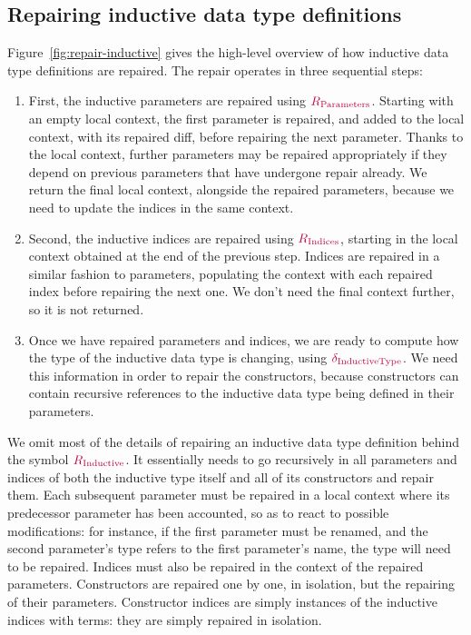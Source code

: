 \subsection{Repairing inductive data type definitions}

Figure~\ref{fig:repair-inductive} gives the high-level overview of how inductive
data type definitions are repaired.  The repair operates in three sequential
steps:

\begin{enumerate}

  \item First, the inductive parameters are repaired using
$\textcolor{purple}{R_{\text{Parameters}}}{}$.  Starting with an empty local context, the first
parameter is repaired, and added to the local context, with its repaired diff,
before repairing the next parameter.  Thanks to the local context, further
parameters may be repaired appropriately if they depend on previous parameters
that have undergone repair already.  We return the final local context,
alongside the repaired parameters, because we need to update the indices in the
same context.

  \item Second, the inductive indices are repaired using $\textcolor{purple}{R_{\text{Indices}}}{}$,
starting in the local context obtained at the end of the previous step.  Indices
are repaired in a similar fashion to parameters, populating the context with
each repaired index before repairing the next one.  We don't need the final
context further, so it is not returned.

  \item Once we have repaired parameters and indices, we are ready to compute
how the type of the inductive data type is changing, using
$\textcolor{purple}{\delta_{\text{InductiveType}}}{}$.  We need this information in order to repair the
constructors, because constructors can contain recursive references to the
inductive data type being defined in their parameters.

\end{enumerate}



We omit most of the details of repairing an inductive data type definition
behind the symbol $\textcolor{purple}{R_{\text{Inductive}}}$.  It essentially needs to go recursively in all
parameters and indices of both the inductive type itself and all of its
constructors and repair them.  Each subsequent parameter must be repaired in a
local context where its predecessor parameter has been accounted, so as to react
to possible modifications: for instance, if the first parameter must be renamed,
and the second parameter's type refers to the first parameter's name, the type
will need to be repaired.  Indices must also be repaired in the context of the
repaired parameters.  Constructors are repaired one by one, in isolation, but
the repairing of their parameters.  Constructor indices are simply instances of
the inductive indices with terms: they are simply repaired in isolation.

